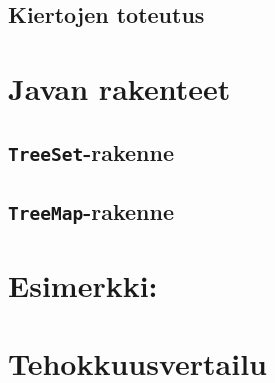 \subsection{Kiertojen toteutus}

\section{Javan rakenteet}

\subsection{\texttt{TreeSet}-rakenne}

\subsection{\texttt{TreeMap}-rakenne}

\section{Esimerkki: }

\section{Tehokkuusvertailu}
